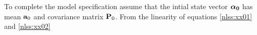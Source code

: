 To complete the model specification assume that the intial state vector
$\boldsymbol{\alpha_0}$ has mean $\mathbf{a}_0$ and covariance matrix $\mathbf{P}_0$.
From the linearity of equations
\ref{nlss:xx01} and \ref{nlss:xx02}

